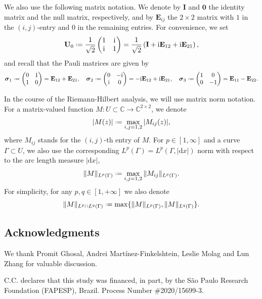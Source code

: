 \documentclass[reqno,a4paper,11pt]{amsart}
\newcommand{\C}{\mathbb{C}}
\newcommand{\ii}{\mathrm{i}}
\newcommand{\dd}{\mathrm{d}}
\newcommand*{\deff}{\mathrel{\vcenter{\baselineskip0.5ex \lineskiplimit0pt
                     \hbox{\scriptsize.}\hbox{\scriptsize.}}}%
                     =}
\renewcommand{\bm}{\mathbf}
\renewcommand{\sp}{\boldsymbol \sigma}
\theoremstyle{definition}
\theoremstyle{remark}
\numberwithin{equation}{section}
\begin{document}
We also use the following matrix notation. We denote by $\bm I$ and $\bm 0$ the identity matrix and the null matrix, respectively, and by $\bm E_{ij}$ the $2\times 2$ matrix with $1$ in the $(i,j)$-entry and $0$ in the remaining entries. For convenience, we set 
\begin{equation}\label{def:U0}
 \bm U_0\deff \frac{1}{\sqrt{2}}
\begin{pmatrix}
    1 & \ii \\ \ii & 1
\end{pmatrix}
=
\frac{1}{\sqrt{2}}
\left(\bm I+\ii \bm E_{12}+\ii \bm E_{21}\right),
\end{equation}
%
and recall that the Pauli matrices are given by
%
$$
\sp_1\deff 
\begin{pmatrix}
    0 & 1 \\ 1 & 0
\end{pmatrix}=
\bm E_{12}+\bm E_{21}, \quad
%
\sp_2\deff 
\begin{pmatrix}
    0 & -\ii \\ \ii & 0
\end{pmatrix}=
-\ii\bm E_{12}+\ii \bm E_{21}, \quad
%
\sp_3\deff 
\begin{pmatrix}
    1 & 0 \\ 0 & -1
\end{pmatrix}=
\bm E_{11}-\bm E_{22}.   
$$

In the course of the Riemann-Hilbert analysis, we will use matrix norm notation. For a matrix-valued function $M:U\subset \C\to \C^{2\times 2}$, we denote
%
$$
|M(z)|\deff \max_{i,j=1,2} |M_{ij}(z)|,
$$
where  $M_{ij}$ stands for the $(i,j)$-th entry of $M$. 
%
For $p\in [1,\infty]$ and a curve $\Gamma\subset U$, we also use the corresponding $L^p(\Gamma)=L^p(\Gamma,|\dd x|)$ norm with respect to the arc length measure $|\dd x|$,
%
$$
\|M\|_{L^p(\Gamma)}\deff \max_{i,j=1,2}\|M_{ij}\|_{L^p(\Gamma)}.
$$
%
For simplicity, for any $p,q\in [1,+\infty]$ we also denote
%
$$
\|M\|_{L^p\cap L^q(\Gamma)}\deff \max \{ \|M\|_{L^p(\Gamma)}, \|M\|_{L^q(\Gamma)} \}.
$$

\subsection*{Acknowledgments}\hfill

We thank Promit Ghosal, Andrei Martínez-Finkelshtein, Leslie Molag and Lun Zhang for valuable discussion. 

C.C. declares that this study was financed, in part, by the São Paulo Research Foundation (FAPESP), Brazil. Process Number \#2020/15699-3.
\end{document}
